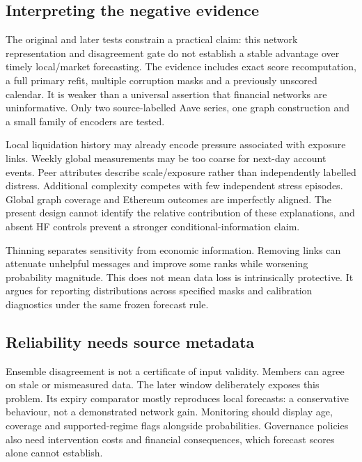 \documentclass[
  10pt,
  a4paper,
]{article}
\begin{document}
\subsection{Interpreting the negative
evidence}\label{interpreting-the-negative-evidence}

The original and later tests constrain a practical claim: this network
representation and disagreement gate do not establish a stable advantage
over timely local/market forecasting. The evidence includes exact score
recomputation, a full primary refit, multiple corruption masks and a
previously unscored calendar. It is weaker than a universal assertion
that financial networks are uninformative. Only two source-labelled Aave
series, one graph construction and a small family of encoders are
tested.

Local liquidation history may already encode pressure associated with
exposure links. Weekly global measurements may be too coarse for
next-day account events. Peer attributes describe scale/exposure rather
than independently labelled distress. Additional complexity competes
with few independent stress episodes. Global graph coverage and Ethereum
outcomes are imperfectly aligned. The present design cannot identify the
relative contribution of these explanations, and absent HF controls
prevent a stronger conditional-information claim.

Thinning separates sensitivity from economic information. Removing links
can attenuate unhelpful messages and improve some ranks while worsening
probability magnitude. This does not mean data loss is intrinsically
protective. It argues for reporting distributions across specified masks
and calibration diagnostics under the same frozen forecast rule.

\subsection{Reliability needs source
metadata}\label{reliability-needs-source-metadata}

Ensemble disagreement is not a certificate of input validity. Members
can agree on stale or mismeasured data. The later window deliberately
exposes this problem. Its expiry comparator mostly reproduces local
forecasts: a conservative behaviour, not a demonstrated network gain.
Monitoring should display age, coverage and supported-regime flags
alongside probabilities. Governance policies also need intervention
costs and financial consequences, which forecast scores alone cannot
establish.
\end{document}
